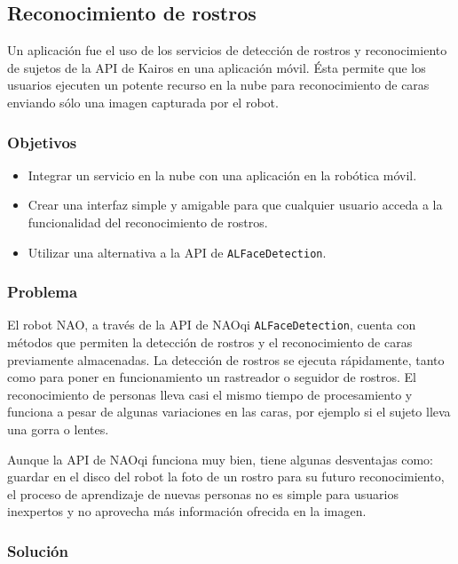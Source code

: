 \subsection{Reconocimiento de rostros}

Un aplicación fue el uso de los servicios de detección de rostros y reconocimiento de sujetos de la API de Kairos en una aplicación móvil. Ésta permite que los usuarios
ejecuten un potente recurso en la nube para reconocimiento
de caras enviando sólo una imagen capturada por el robot.

\subsubsection{Objetivos}

\begin{itemize}
    \item Integrar un servicio en la nube con una aplicación
    en la robótica móvil.
    \item Crear una interfaz simple y amigable para que cualquier usuario acceda a la funcionalidad del reconocimiento de rostros.
    \item Utilizar una alternativa a la API de \texttt{ALFaceDetection}.
\end{itemize}

\subsubsection{Problema}

El robot NAO, a través de la API de NAOqi \texttt{ALFaceDetection},
cuenta con métodos que permiten la detección de rostros
y el reconocimiento de caras previamente almacenadas.
La detección de rostros se ejecuta rápidamente, tanto como
para poner en funcionamiento un rastreador o seguidor
de rostros. El reconocimiento de personas lleva casi el 
mismo tiempo de procesamiento y funciona a pesar de algunas
variaciones en las caras, por ejemplo si el sujeto lleva 
una gorra o lentes.

Aunque la API de NAOqi funciona muy bien, tiene
algunas desventajas como: guardar en el disco del robot la foto de un 
rostro para su futuro reconocimiento, el proceso de aprendizaje 
de nuevas personas no es simple para usuarios inexpertos
y no aprovecha más información ofrecida en la imagen.

\subsubsection{Solución}

